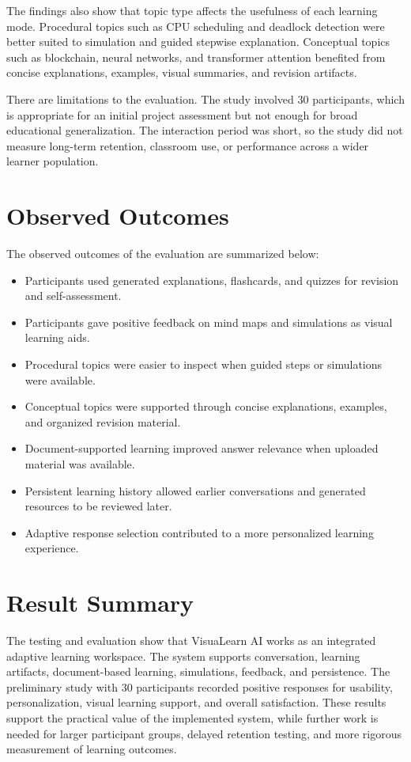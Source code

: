 The findings also show that topic type affects the usefulness of each learning mode. Procedural topics such as CPU scheduling and deadlock detection were better suited to simulation and guided stepwise explanation. Conceptual topics such as blockchain, neural networks, and transformer attention benefited from concise explanations, examples, visual summaries, and revision artifacts.

There are limitations to the evaluation. The study involved 30 participants, which is appropriate for an initial project assessment but not enough for broad educational generalization. The interaction period was short, so the study did not measure long-term retention, classroom use, or performance across a wider learner population.

\section[Observed Outcomes]{\textbf{Observed Outcomes}}
The observed outcomes of the evaluation are summarized below:
\begin{itemize}[leftmargin=1.2cm]
	\item Participants used generated explanations, flashcards, and quizzes for revision and self-assessment.
	\item Participants gave positive feedback on mind maps and simulations as visual learning aids.
	\item Procedural topics were easier to inspect when guided steps or simulations were available.
	\item Conceptual topics were supported through concise explanations, examples, and organized revision material.
	\item Document-supported learning improved answer relevance when uploaded material was available.
	\item Persistent learning history allowed earlier conversations and generated resources to be reviewed later.
	\item Adaptive response selection contributed to a more personalized learning experience.
\end{itemize}

\section[Result Summary]{\textbf{Result Summary}}
The testing and evaluation show that VisuaLearn AI works as an integrated adaptive learning workspace. The system supports conversation, learning artifacts, document-based learning, simulations, feedback, and persistence. The preliminary study with 30 participants recorded positive responses for usability, personalization, visual learning support, and overall satisfaction. These results support the practical value of the implemented system, while further work is needed for larger participant groups, delayed retention testing, and more rigorous measurement of learning outcomes.
